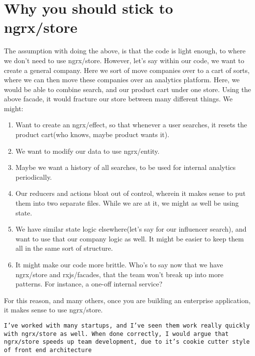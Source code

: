 \section{Why you should stick to ngrx/store}
The assumption with doing the above, is that the code is light enough, to where we don't need to use ngrx/store. However, let's say within our code, we want to create a general company. Here we sort of move companies over to a cart of sorts, where we can then move these companies over an analytics platform. Here, we would be able to combine search, and our product cart under one store. Using the above facade, it would fracture our store between many different things. We might: 
\begin{enumerate}
  \item Want to create an ngrx/effect, so that whenever a user searches, it resets the product cart(who knows, maybe product wants it).
  \item We want to modify our data to use ngrx/entity. 
  \item Maybe we want a history of all searches, to be used for internal analytics periodically. 
  \item Our reducers and actions bloat out of control, wherein it makes sense to put them into two separate files. While we are at it, we might as well be using state. 
  \item We have similar state logic elsewhere(let's say for our influencer search), and want to use that our company logic as well. It might be easier to keep them all in the same sort of structure.
  \item It might make our code more brittle. Who's to say now that we have ngrx/store and rxjs/facades, that the team won't break up into more patterns. For instance, a one-off internal service? 
\end{enumerate}

For this reason, and many others, once you are building an enterprise application, it makes sense to use ngrx/store. 

\texttt{I've worked with many startups, and I've seen them work really quickly with ngrx/store as well. When done correctly, I would argue that ngrx/store speeds up team development, due to it's cookie cutter style of front end architecture}

